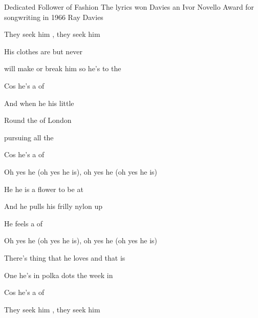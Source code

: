 \begin{SBSong}{Dedicated Follower of Fashion}
  {The lyrics won Davies an Ivor Novello Award for songwriting in 1966}
  {Ray Davies}
  \begin{SBVerse}
      They seek him , they seek him 
    
    His clothes are  but never  
    
     will make or break him so he's  to  the 
    
    Cos he's a   of 
  \end{SBVerse}
  \begin{SBVerse}
    And when he  his little 
    
    Round the  of London  
    
     pursuing all the   
    
    Cos he's a   of 
  \end{SBVerse}
  \begin{SBVerse}
    Oh yes he  (oh yes he is), oh yes he  (oh yes he is)
    
    He  he is a flower to be  at
    
    And  he pulls his frilly nylon   up 
    
    He feels a   of 
  \end{SBVerse}
  \begin{SBVerse}
    Oh yes he  (oh yes he is), oh yes he  (oh yes he is)
    
    There's  thing that he loves and that is 
    
    One he's in polka dots the  week  in 
    
    Cos he's a   of 
  \end{SBVerse}
  \begin{SBVerse}
    They seek him , they seek him 
    

\end{SBVerse}
\end{SBSong}
